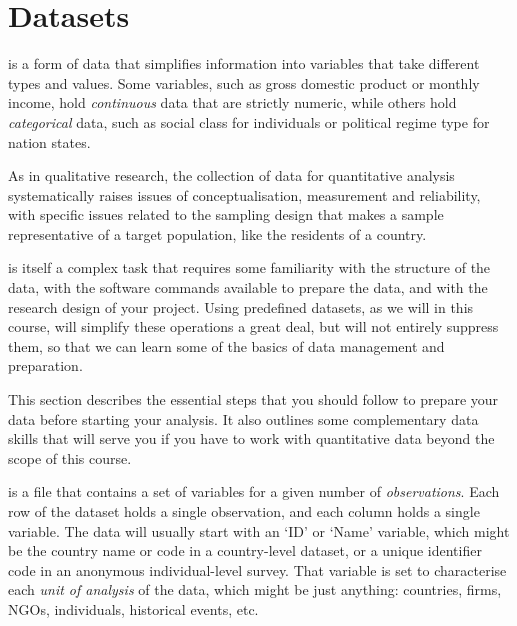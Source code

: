%
%
\chapter{Datasets}%
	\label{ch:data}%
	\minitoc
	\newpage
	


 is a form of data that simplifies information into variables that take different types and values. Some variables, such as gross domestic product or monthly income, hold \emph{continuous} data that are strictly numeric, while others hold \emph{categorical} data, such as social class for individuals or political regime type for nation states.%

As in qualitative research, the collection of data for quantitative analysis systematically raises issues of conceptualisation, measurement and reliability, with specific issues related to the sampling design that makes a sample representative of a target population, like the residents of a country.

 is itself a complex task that requires some familiarity with the structure of the data, with the software commands available to prepare the data, and with the research design of your project. Using predefined datasets, as we will in this course, will simplify these operations a great deal, but will not entirely suppress them, so that we can learn some of the basics of data management and preparation.

This section describes the essential steps that you should follow to prepare your data before starting your analysis. It also outlines some complementary data skills that will serve you if you have to work with quantitative data beyond the scope of this course.

 is a file that contains a set of variables for a given number of \emph{observations}. Each row of the dataset holds a single observation, and each column holds a single variable. The data will usually start with an `ID' or `Name' variable, which might be the country name or code in a country-level dataset, or a unique identifier code in an anonymous individual-level survey. That variable is set to characterise each \emph{unit of analysis} of the data, which might be just anything: countries, firms, NGOs, individuals, historical events, etc.

